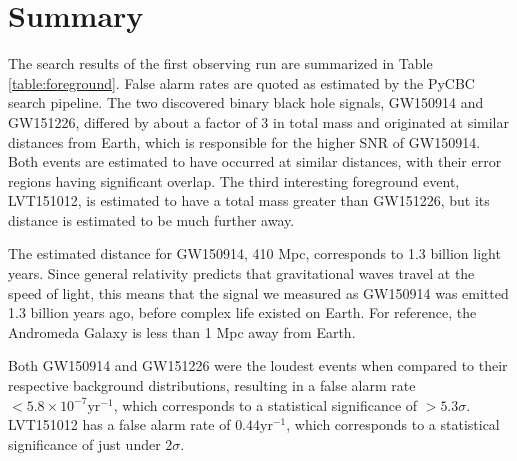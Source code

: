 \section{Summary}

The search results of the first observing run are summarized in Table 
\ref{table:foreground}. False alarm rates are quoted as estimated by the 
PyCBC search pipeline.  
The two discovered binary black hole signals, GW150914 and GW151226, differed 
by about a factor of 3 in total mass and originated at similar distances 
from Earth, which is responsible for the higher SNR  
of GW150914. Both events are estimated to have occurred at similar distances, 
with their error regions having significant overlap. 
The third interesting foreground event,
LVT151012, is estimated to have a total mass greater than GW151226, but its
distance is estimated to be much further away.

The estimated distance for 
GW150914, 410 Mpc, corresponds to 1.3 billion light years. Since general 
relativity predicts that gravitational waves travel at the speed of light, 
this means that the signal we measured as GW150914 was emitted 1.3 billion 
years ago, before complex life existed on Earth. For reference, 
the Andromeda Galaxy is less than 1 Mpc away from Earth. 

Both GW150914 and GW151226 were the loudest events when compared to their 
respective background distributions, resulting in a false alarm rate 
$< 5.8\times10^{-7} \mathrm{yr}^{-1}$, which corresponds to a statistical significance of 
$> 5.3\sigma$. LVT151012 has a false alarm rate of $0.44 \mathrm{yr}^{-1}$, which 
corresponds to a statistical significance of just under $2\sigma$.


